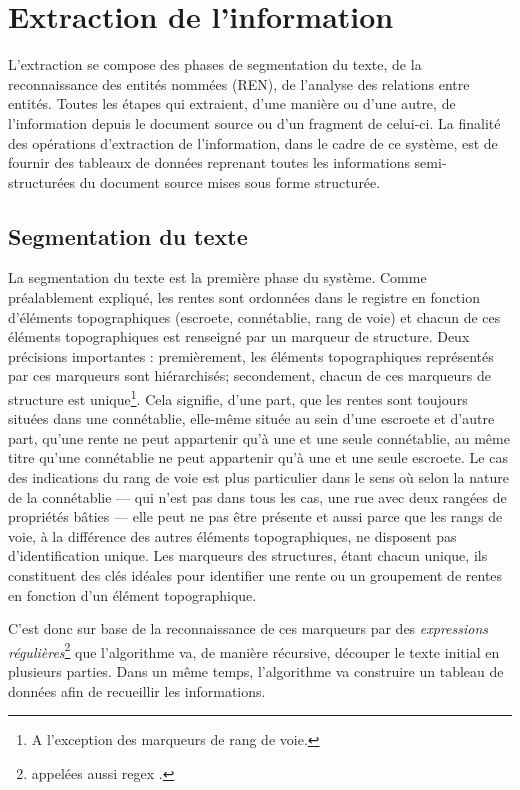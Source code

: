 \section{Extraction de l'information}
L'extraction se compose des phases de segmentation du texte, de la reconnaissance des entités nommées (REN), de l'analyse des relations entre entités. Toutes les étapes qui extraient, d'une manière ou d'une autre, de l'information depuis le document source ou d'un fragment de celui-ci. 
La finalité des opérations d'extraction de l'information, dans le cadre de ce système, est de fournir des tableaux de données reprenant toutes les informations semi-structurées du document source mises sous forme structurée.

\subsection{Segmentation du texte}
La segmentation du texte est la première phase du système. Comme préalablement expliqué, les rentes sont ordonnées dans le registre en fonction d'éléments topographiques (escroete, connétablie, rang de voie) et chacun de ces éléments topographiques est renseigné par un marqueur de structure. Deux précisions  importantes : premièrement, les éléments topographiques représentés par ces marqueurs sont hiérarchisés; secondement, chacun de ces marqueurs de structure est unique\footnote{A l'exception des marqueurs de rang de voie.}.
Cela signifie, d'une part, que les rentes sont toujours situées dans une connétablie, elle-même située au sein d'une escroete et d’autre part, qu'une rente ne peut appartenir qu'à une et une seule connétablie, au même titre qu'une connétablie ne peut appartenir qu'à une et une seule escroete.
Le cas des indications du rang de voie est plus particulier dans le sens où selon la nature de la connétablie --- qui n'est pas dans tous les cas, une rue avec deux rangées de propriétés bâties --- elle peut ne pas être présente et aussi parce que les rangs de voie, à la différence des autres éléments topographiques, ne disposent pas d'identification unique.
Les marqueurs des structures, étant chacun unique, ils constituent des clés idéales pour identifier une rente ou un groupement de rentes en fonction d'un élément topographique. 

C'est donc sur base de la reconnaissance de ces marqueurs par des \textit{expressions régulières}\footnote{appelées aussi \og regex \fg{}.} que l'algorithme va, de manière récursive, découper le texte initial en plusieurs parties. Dans un même temps, l'algorithme va construire un tableau de données afin de  recueillir les informations. 

